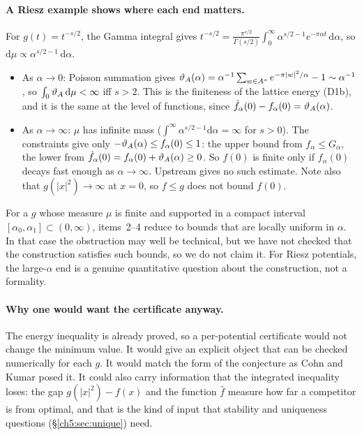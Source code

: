 \paragraph{A Riesz example shows where each end matters.}
\tierC{} For $g(t)=t^{-s/2}$, the Gamma integral gives $t^{-s/2}=\frac{\pi^{s/2}}{\Gamma(s/2)}\int_0^\infty
\alpha^{s/2-1}e^{-\pi\alpha t}\,\mathrm{d}\alpha$, so $\mathrm{d}\mu\propto\alpha^{s/2-1}\,\mathrm{d}\alpha$.
\begin{itemize}[leftmargin=*]
\item As $\alpha\to0$: Poisson summation gives $\vartheta_A(\alpha)=\alpha^{-1}\sum_{w\in A^*}e^{-\pi|w|^2/\alpha}-1
  \sim\alpha^{-1}$, so $\int_0\vartheta_A\,\mathrm{d}\mu<\infty$ iff $s>2$. This is the finiteness of the lattice
  energy (D1b), and it is the same at the level of functions, since $\hat f_\alpha(0)-f_\alpha(0)=\vartheta_A(\alpha)$.
\item As $\alpha\to\infty$: $\mu$ has infinite mass ($\int^\infty\alpha^{s/2-1}\mathrm{d}\alpha=\infty$ for $s>0$). The
  constraints give only $-\vartheta_A(\alpha)\le f_\alpha(0)\le1$: the upper bound from $f_\alpha\le G_\alpha$, the lower
  from $\hat f_\alpha(0)=f_\alpha(0)+\vartheta_A(\alpha)\ge0$. So $f(0)$ is finite only if $f_\alpha(0)$ decays fast
  enough as $\alpha\to\infty$. Upstream gives no such estimate. Note also that $g(|x|^2)\to\infty$ at $x=0$, so
  $f\le g$ does not bound $f(0)$.
\end{itemize}
For a $g$ whose measure $\mu$ is finite and supported in a compact interval $[\alpha_0,\alpha_1]\subset(0,\infty)$,
items~2--4 reduce to bounds that are locally uniform in $\alpha$. In that case the obstruction may well be technical,
but we have not checked that the construction satisfies such bounds, so we do not claim it. For Riesz potentials,
the large-$\alpha$ end is a genuine quantitative question about the construction, not a formality.

\paragraph{Why one would want the certificate anyway.}
\tierC{} The energy inequality is already proved, so a per-potential certificate would not change the minimum value.
It would give an explicit object that can be checked numerically for each $g$. It would match the form of the
conjecture as Cohn and Kumar posed it. It could also carry information that the integrated inequality loses: the
gap $g(|x|^2)-f(x)$ and the function $\hat f$ measure how far a competitor is from optimal, and that is the kind of
input that stability and uniqueness questions (\S\ref{ch5:sec:unique}) need.

